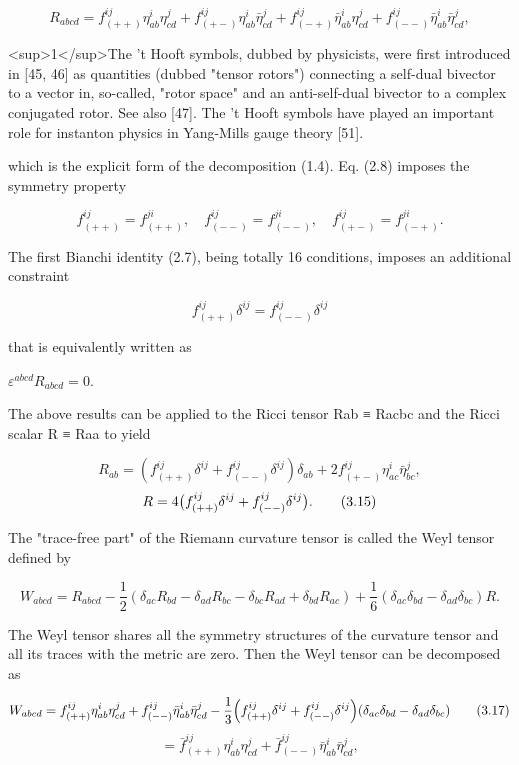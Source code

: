 \documentclass{article}
\begin{document}
$$R_{abcd}=f^{ij}_{(++)}\eta^{i}_{ab}\eta^{j}_{cd}+f^{ij}_{(+-)}\eta^{i}_{ab}\bar{\eta}^{j}_{cd}+f^{ij}_{(-+)}\bar{\eta}^{i}_{ab}\eta^{j}_{cd}+f^{ij}_{(--)}\bar{\eta}^{i}_{ab}\bar{\eta}^{j}_{cd},\tag{3.11}$$

<sup>1</sup>The 't Hooft symbols, dubbed by physicists, were first introduced in [45, 46] as quantities (dubbed "tensor rotors") connecting a self-dual bivector to a vector in, so-called, "rotor space" and an anti-self-dual bivector to a complex conjugated rotor. See also [47]. The 't Hooft symbols have played an important role for instanton physics in Yang-Mills gauge theory [51].

which is the explicit form of the decomposition (1.4). Eq. (2.8) imposes the symmetry property

$$f^{ij}_{(++)}=f^{ji}_{(++)},\quad f^{ij}_{(--)}=f^{ji}_{(--)},\quad f^{ij}_{(+-)}=f^{ji}_{(-+)}.\tag{3.12}$$

The first Bianchi identity (2.7), being totally 16 conditions, imposes an additional constraint

$$f^{ij}_{(++)}\delta^{ij}=f^{ij}_{(--)}\delta^{ij}\tag{3.13}$$

that is equivalently written as

$\varepsilon^{abcd}R_{abcd}=0$.

The above results can be applied to the Ricci tensor Rab ≡ Racbc and the Ricci scalar R ≡ Raa to yield

$$R_{ab}=\left(f^{ij}_{(++)}\delta^{ij}+f^{ij}_{(--)}\delta^{ij}\right)\delta_{ab}+2f^{ij}_{(+-)}\eta^{i}_{ac}\bar{\eta}^{j}_{bc},$$ $$R=4\big{(}f^{ij}_{(++)}\delta^{ij}+f^{ij}_{(--)}\delta^{ij}\big{)}.\tag{3.15}$$

The "trace-free part" of the Riemann curvature tensor is called the Weyl tensor defined by

$$W_{abcd}=R_{abcd}-\frac{1}{2}(\delta_{ac}R_{bd}-\delta_{ad}R_{bc}-\delta_{bc}R_{ad}+\delta_{bd}R_{ac})+\frac{1}{6}(\delta_{ac}\delta_{bd}-\delta_{ad}\delta_{bc})R.\tag{3.16}$$

The Weyl tensor shares all the symmetry structures of the curvature tensor and all its traces with the metric are zero. Then the Weyl tensor can be decomposed as

$$W_{abcd}=f^{ij}_{(++)}\eta^{i}_{ab}\eta^{j}_{cd}+f^{ij}_{(--)}\bar{\eta}^{i}_{ab}\bar{\eta}^{j}_{cd}-\frac{1}{3}\Big{(}f^{ij}_{(++)}\delta^{ij}+f^{ij}_{(--)}\delta^{ij}\Big{)}(\delta_{ac}\delta_{bd}-\delta_{ad}\delta_{bc})\tag{3.17}$$ $$=\bar{f}^{ij}_{(++)}\eta^{i}_{ab}\eta^{j}_{cd}+\bar{f}^{ij}_{(--)}\bar{\eta}^{i}_{ab}\bar{\eta}^{j}_{cd},$$
\end{document}
